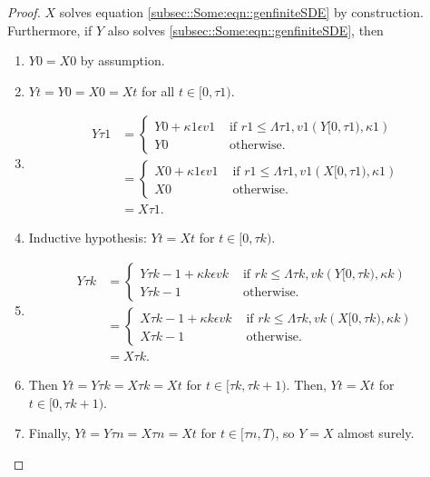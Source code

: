 \documentclass[12pt]{article}
\newcommand{\te}{\text}
\newcommand{\ep}{\epsilon}
\renewcommand{\v}{v}							%
\newcommand{\ev}{\ep}							%
\newcommand{\T}{T}								%
\renewcommand{\t}{t}							%
\newcommand{\X}{X}								%
\renewcommand{\r}{r}							%
\newcommand{\XX}{Y}								%
\newcommand{\rt}{\tau}							%
\renewcommand{\it}{k}							%
\renewcommand{\mark}{\kappa}					%
\newcommand{\ratee}{\Lambda}					%
\begin{document}
\begin{proof}
\(\X{}{}\) solves equation \eqref{subsec::Some:eqn::genfiniteSDE} by construction. Furthermore, if \(\XX{}{}\) also solves \eqref{subsec::Some:eqn::genfiniteSDE}, then 

\begin{enumerate}
\item \(\XX{}{0} = \X{}{0}\) by assumption.

\item \(\XX{}{\t} = \XX{}{0} = \X{}{0} = \X{}{\t}\) for all \(\t\in [0,\rt{1})\).

\item 

\begin{align*}
\XX{}{\rt{1}} &= \begin{cases}
\XX{}{0} + \mark{1}\ev{\v{1}} &\te{ if } \r{1} \leq \ratee{\rt{1},\v{1}}(\XX{}{[0,\rt{1})},\mark{1})\\
\XX{}{0} &\te{ otherwise.}
\end{cases}\\
&= \begin{cases}
\X{}{0} + \mark{1}\ev{\v{1}} &\te{ if } \r{1} \leq \ratee{\rt{1},\v{1}}(\X{}{[0,\rt{1})},\mark{1})\\
\X{}{0} &\te{ otherwise.}
\end{cases}\\
&= \X{}{\rt{1}}.
\end{align*}

\item Inductive hypothesis: \(\XX{}{\t} = \X{}{\t}\) for \(\t\in [0,\rt{\it})\). 

\item 

\begin{align*}
\XX{}{\rt{\it}} &= \begin{cases}
\XX{}{\rt{\it-1}} + \mark{\it}\ev{\v{\it}} &\te{ if } \r{\it} \leq \ratee{\rt{\it},\v{\it}}(\XX{}{[0,\rt{\it})},\mark{\it})\\
\XX{}{\rt{\it-1}} &\te{ otherwise.}
\end{cases}\\
&= \begin{cases}
\X{}{\rt{\it-1}} + \mark{\it}\ev{\v{\it}} &\te{ if } \r{\it} \leq \ratee{\rt{\it},\v{\it}}(\X{}{[0,\rt{\it})},\mark{\it})\\
\X{}{\rt{\it-1}} &\te{ otherwise.}
\end{cases}\\
&= \X{}{\rt{\it}}.
\end{align*}

\item Then \(\XX{}{\t} = \XX{}{\rt{\it}} = \X{}{\rt{\it}} = \X{}{\t}\) for \(\t \in [\rt{\it},\rt{\it+1})\). Then, \(\XX{}{\t} = \X{}{\t}\) for \(\t\in [0,\rt{\it+1})\).

\item Finally, \(\XX{}{\t} = \XX{}{\rt{n}} = \X{}{\rt{n}} = \X{}{\t}\) for \(\t\in [\rt{n},\T)\), so \(\XX{}{} = \X{}{}\) almost surely.
\end{enumerate}
\end{proof}
\end{document}
